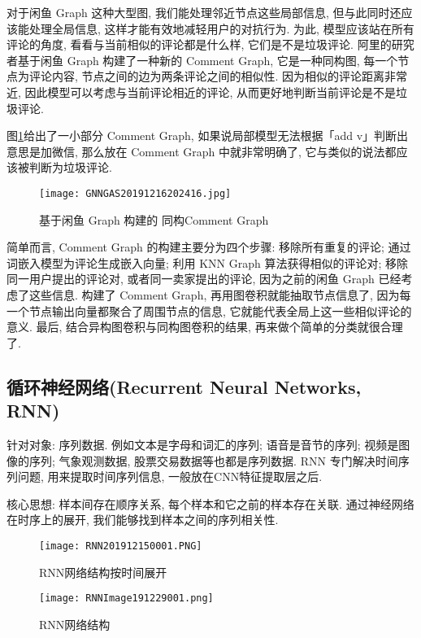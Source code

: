 对于闲鱼 Graph 这种大型图, 我们能处理邻近节点这些局部信息, 但与此同时还应该能处理全局信息, 这样才能有效地减轻用户的对抗行为. 为此, 模型应该站在所有评论的角度, 看看与当前相似的评论都是什么样, 它们是不是垃圾评论.
阿里的研究者基于闲鱼 Graph 构建了一种新的 Comment Graph, 它是一种同构图, 每一个节点为评论内容, 节点之间的边为两条评论之间的相似性. 因为相似的评论距离非常近, 因此模型可以考虑与当前评论相近的评论, 从而更好地判断当前评论是不是垃圾评论.

图\ref{GNNGAS20191216202416}给出了一小部分 Comment Graph, 如果说局部模型无法根据「add v」判断出意思是加微信, 那么放在 Comment Graph 中就非常明确了, 它与类似的说法都应该被判断为垃圾评论.
\begin{figure}[H]
\centering
\texttt{[image: GNNGAS20191216202416.jpg]}
\caption{基于闲鱼 Graph 构建的 同构Comment Graph}
\label{GNNGAS20191216202416}\vspace{-0.4cm}
\end{figure}
简单而言, Comment Graph 的构建主要分为四个步骤: 移除所有重复的评论; 通过词嵌入模型为评论生成嵌入向量; 利用 KNN Graph 算法获得相似的评论对;
移除同一用户提出的评论对, 或者同一卖家提出的评论, 因为之前的闲鱼 Graph 已经考虑了这些信息.
构建了 Comment Graph, 再用图卷积就能抽取节点信息了, 因为每一个节点输出向量都聚合了周围节点的信息, 它就能代表全局上这一些相似评论的意义.
最后, 结合异构图卷积与同构图卷积的结果, 再来做个简单的分类就很合理了.
\subsection{循环神经网络(Recurrent Neural Networks, RNN)}
针对对象: 序列数据. 例如文本是字母和词汇的序列; 语音是音节的序列; 视频是图像的序列; 气象观测数据, 股票交易数据等也都是序列数据. RNN 专门解决时间序列问题, 用来提取时间序列信息, 一般放在CNN特征提取层之后.

核心思想: 样本间存在顺序关系,  每个样本和它之前的样本存在关联.  通过神经网络在时序上的展开,  我们能够找到样本之间的序列相关性.
\begin{figure}[H]
\centering
\texttt{[image: RNN201912150001.PNG]}
\caption{RNN网络结构按时间展开}
\label{RNN201912150001}\vspace{-0.4cm}
\end{figure}
\begin{figure}[H]
\centering
\texttt{[image: RNNImage191229001.png]}
\caption{RNN网络结构}
\label{RNNImage191229001}\vspace{-0.4cm}
\end{figure}

